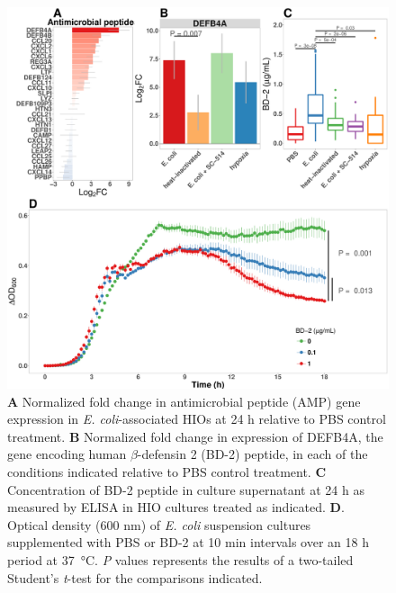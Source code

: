 \documentclass[9pt,lineo]{elife}
\begin{document}
\begin{figure}
\begin{fullwidth}
\centering
\includegraphics[width=0.95\linewidth]{./figures/figure5/figure5_multipanel.pdf}
\caption{\textbf{A} Normalized fold change in antimicrobial peptide (AMP) gene expression in \textit{E. coli}-associated HIOs at 24 h relative to PBS control treatment. \textbf{B} Normalized fold change in expression of DEFB4A, the gene encoding human $\beta$-defensin 2 (BD-2) peptide, in each of the conditions indicated relative to PBS control treatment. \textbf{C} Concentration of BD-2 peptide in culture supernatant at 24 h as measured by ELISA in HIO cultures treated as indicated. \textbf{D}. Optical density (600 nm) of \textit{E. coli} suspension cultures supplemented with PBS or BD-2 at 10 min intervals over an 18 h period at \SI{37}{\celsius}. \textit{P} values represents the results of a two-tailed Student's \textit{t}-test  for the comparisons indicated.}
\label{fig:fullwidth}
\end{fullwidth}
\end{figure}
\end{document}
